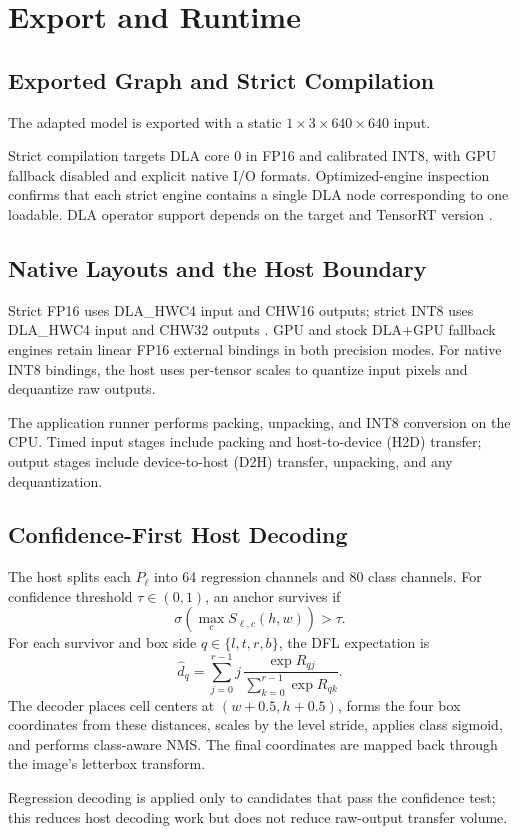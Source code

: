 \section{Export and Runtime}
\label{sec:deployment}
\subsection{Exported Graph and Strict Compilation}
The adapted model is exported with a static $1\times3\times640\times640$ input.

Strict compilation targets DLA core 0 in FP16 and calibrated INT8, with GPU
fallback disabled and explicit native I/O formats. Optimized-engine inspection
confirms that each strict engine contains a single DLA node corresponding to
one loadable. DLA operator support depends on the target and TensorRT version
\cite{nvidia_dla_working}.

\subsection{Native Layouts and the Host Boundary}
\label{sec:packing}
Strict FP16 uses DLA\_HWC4 input and CHW16 outputs; strict INT8 uses
DLA\_HWC4 input and CHW32 outputs \cite{nvidia_dla_working}.
GPU and stock DLA+GPU fallback engines retain linear FP16 external bindings
in both precision modes. For native INT8 bindings, the host uses per-tensor
scales to quantize input pixels and dequantize raw outputs.

The application runner performs packing, unpacking, and INT8 conversion on the
CPU. Timed input stages include packing and host-to-device (H2D) transfer;
output stages include device-to-host (D2H) transfer, unpacking, and any
dequantization.

\subsection{Confidence-First Host Decoding}
\label{sec:decode}
The host splits each $P_\ell$ into 64 regression channels and 80 class channels.
For confidence threshold $\tau\in(0,1)$, an anchor survives if
\begin{equation}
 \sigma\!\left(\max_c S_{\ell,c}(h,w)\right) > \tau.
 \label{eq:threshold}
\end{equation}
For each survivor and box side $q\in\{l,t,r,b\}$, the DFL expectation is
\begin{equation}
 \hat d_q=\sum_{j=0}^{r-1}j\,
 \frac{\exp R_{qj}}{\sum_{k=0}^{r-1}\exp R_{qk}}.
 \label{eq:dfl}
\end{equation}
The decoder places cell centers at $(w+0.5,h+0.5)$, forms the four box
coordinates from these distances, scales by the level stride, applies class
sigmoid, and performs class-aware NMS. The final coordinates are mapped back
through the image's letterbox transform.

Regression decoding is applied only to candidates that pass the confidence
test; this reduces host decoding work but does not reduce raw-output transfer volume.
